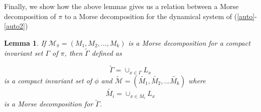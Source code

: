 \documentclass{article}
\newtheorem{lemma}[theorem]{Lemma}
\theoremstyle{definition}
\begin{document}
Finally, we show how the above lemmas gives us a relation between a Morse decomposition of $\pi$ to a Morse decomposition for the dynamical system of (\ref{auto}-\ref{auto2})


\begin{lemma}\label{lemma:md_analog}
    If $\mathcal{M}_\pi = (M_1, M_2, ..., M_k)$ is a Morse decomposition for a compact invariant set $\Gamma$ of $\pi$, then $\tilde{\Gamma}$ defined as

\begin{equation}
    \tilde{\Gamma} = \cup_{x\in \Gamma} L_x
\end{equation}
    is a compact invariant set of $\phi$  and 
    $\tilde{\mathcal{M}}= (\tilde{M_1}, \tilde{M_2},...\tilde{M_k})$ 
    where
    $$
    \tilde{M_i} = \cup_{x\in M_i} L_x
    $$
    is a Morse decomposition for $\tilde{\Gamma}$.
\end{lemma}
\end{document}
